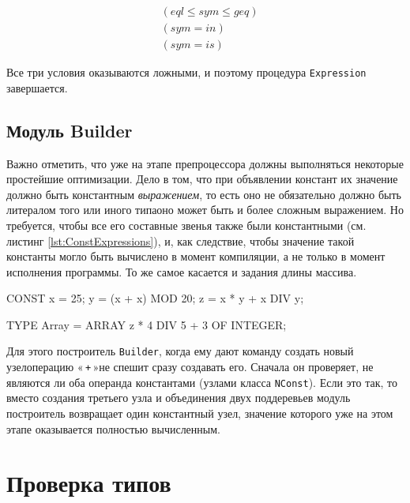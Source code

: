 \documentclass[utf8]{lgu}
\newcommand{\tire}{\unskip\nobreak\thinspace\textemdash\thinspace}
\newcommand{\code}[1]{{\normalsize\texttt{#1}}}
\begin{document}
\begin{align}
& (\mathit{eql} \leqslant \mathit{sym} \leqslant \mathit{geq}) \\
& (\mathit{sym} = \mathit{in}) \\
& (\mathit{sym} = \mathit{is})
\end{align}

Все три условия оказываются ложными, и поэтому процедура \code{Expression} завершается.

\subsection{Модуль Builder}

Важно отметить, что уже на этапе препроцессора должны выполняться некоторые простейшие оптимизации. Дело в том, что при объявлении констант их значение должно быть константным \textit{выражением}, то есть оно не обязательно должно быть литералом того или иного типа\tire оно может быть и более сложным выражением. Но требуется, чтобы все его составные звенья также были константными (см. листинг \ref{lst:ConstExpressions}), и, как следствие, чтобы значение такой константы могло быть вычислено в момент компиляции, а не только в момент исполнения программы. То же самое касается и задания длины массива.

\begin{listing}[H]
\caption{Пример использования константных выражений}
\vspace{-17pt}
\label{lst:ConstExpressions}
\begin{modula2}
CONST
  x = 25;
  y = (x + x) MOD 20;
  z = x * y + x DIV y;

TYPE Array = ARRAY z * 4 DIV 5 + 3 OF INTEGER;
\end{modula2}
\end{listing}

Для этого построитель \code{Builder}, когда ему дают команду создать новый узел\tire операцию «\,\code{+}\,»\tire не спешит сразу создавать его. Сначала он проверяет, не являются ли оба операнда константами (узлами класса \code{NConst}). Если это так, то вместо создания третьего узла и объединения двух поддеревьев модуль построитель возвращает один константный узел, значение которого уже на этом этапе оказывается полностью вычисленным.

\section{Проверка типов}
\end{document}
